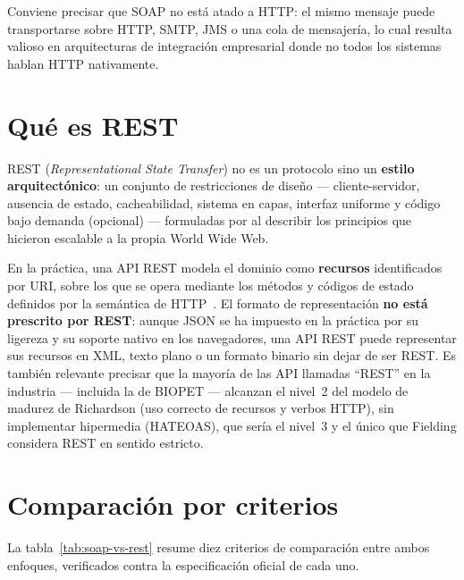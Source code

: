 Conviene precisar que SOAP no est\'a atado a HTTP: el mismo mensaje puede
transportarse sobre HTTP, SMTP, JMS o una cola de mensajer\'ia, lo cual
resulta valioso en arquitecturas de integraci\'on empresarial donde no todos
los sistemas hablan HTTP nativamente.

\section{Qu\'e es REST}
\label{sec:que-es-rest}

REST (\emph{Representational State Transfer}) no es un protocolo sino un
\textbf{estilo arquitect\'onico}: un conjunto de restricciones de dise\~no
--- cliente-servidor, ausencia de estado, cacheabilidad, sistema en capas,
interfaz uniforme y c\'odigo bajo demanda (opcional) --- formuladas por
\textcite{fielding2000} al describir los principios que hicieron
escalable a la propia World Wide Web.

En la pr\'actica, una API REST modela el dominio como \textbf{recursos}
identificados por URI, sobre los que se opera mediante los m\'etodos y
c\'odigos de estado definidos por la sem\'antica de
HTTP~\parencite{rfc9110}. El formato de representaci\'on \textbf{no est\'a
prescrito por REST}: aunque JSON se ha impuesto en la pr\'actica por su
ligereza y su soporte nativo en los navegadores, una API REST puede
representar sus recursos en XML, texto plano o un formato binario sin dejar
de ser REST. Es tambi\'en relevante precisar que la mayor\'ia de las API
llamadas ``REST'' en la industria --- incluida la de BIOPET --- alcanzan el
nivel~2 del modelo de madurez de Richardson (uso correcto de recursos y
verbos HTTP), sin implementar hipermedia (HATEOAS), que ser\'ia el nivel~3 y
el \'unico que Fielding considera REST en sentido estricto.

\section{Comparaci\'on por criterios}
\label{sec:soap-rest-criterios}

La tabla~\ref{tab:soap-vs-rest} resume diez criterios de comparaci\'on entre
ambos enfoques, verificados contra la especificaci\'on oficial de cada uno.

